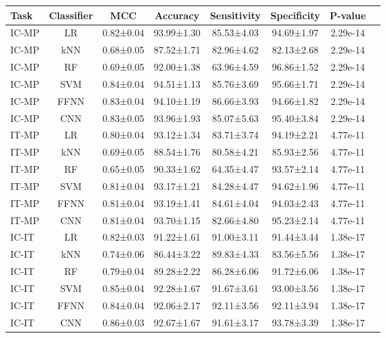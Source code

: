 \begin{tabular}{lccccccc}
\toprule
 Task & Classifier &       MCC &   Accuracy & Sensitivity & Specificity &  P-value \\
\midrule
IC-MP &         LR & 0.82±0.04 & 93.99±1.30 &  85.53±4.03 &  94.69±1.97 & 2.29e-14 \\
IC-MP &        kNN & 0.68±0.05 & 87.52±1.71 &  82.96±4.62 &  82.13±2.68 & 2.29e-14 \\
IC-MP &         RF & 0.69±0.05 & 92.00±1.38 &  63.96±4.59 &  96.86±1.52 & 2.29e-14 \\
IC-MP &        SVM & 0.84±0.04 & 94.51±1.13 &  85.76±3.69 &  95.66±1.71 & 2.29e-14 \\
IC-MP &       FFNN & 0.83±0.04 & 94.10±1.19 &  86.66±3.93 &  94.66±1.82 & 2.29e-14 \\
IC-MP &        CNN & 0.83±0.05 & 93.96±1.93 &  85.07±5.63 &  95.40±3.84 & 2.29e-14 \\
IT-MP &         LR & 0.80±0.04 & 93.12±1.34 &  83.71±3.74 &  94.19±2.21 & 4.77e-11 \\
IT-MP &        kNN & 0.69±0.05 & 88.54±1.76 &  80.58±4.21 &  85.93±2.56 & 4.77e-11 \\
IT-MP &         RF & 0.65±0.05 & 90.33±1.62 &  64.35±4.47 &  93.57±2.14 & 4.77e-11 \\
IT-MP &        SVM & 0.81±0.04 & 93.17±1.21 &  84.28±4.47 &  94.62±1.96 & 4.77e-11 \\
IT-MP &       FFNN & 0.81±0.04 & 93.19±1.41 &  84.61±4.04 &  94.03±2.43 & 4.77e-11 \\
IT-MP &        CNN & 0.81±0.04 & 93.70±1.15 &  82.66±4.80 &  95.23±2.14 & 4.77e-11 \\
IC-IT &         LR & 0.82±0.03 & 91.22±1.61 &  91.00±3.11 &  91.44±3.44 & 1.38e-17 \\
IC-IT &        kNN & 0.74±0.06 & 86.44±3.22 &  89.83±4.33 &  83.56±5.56 & 1.38e-17 \\
IC-IT &         RF & 0.79±0.04 & 89.28±2.22 &  86.28±6.06 &  91.72±6.06 & 1.38e-17 \\
IC-IT &        SVM & 0.85±0.04 & 92.28±1.67 &  91.67±3.61 &  93.00±3.56 & 1.38e-17 \\
IC-IT &       FFNN & 0.84±0.04 & 92.06±2.17 &  92.11±3.56 &  92.11±3.94 & 1.38e-17 \\
IC-IT &        CNN & 0.86±0.03 & 92.67±1.67 &  91.61±3.17 &  93.78±3.39 & 1.38e-17 \\
\bottomrule
\end{tabular}
